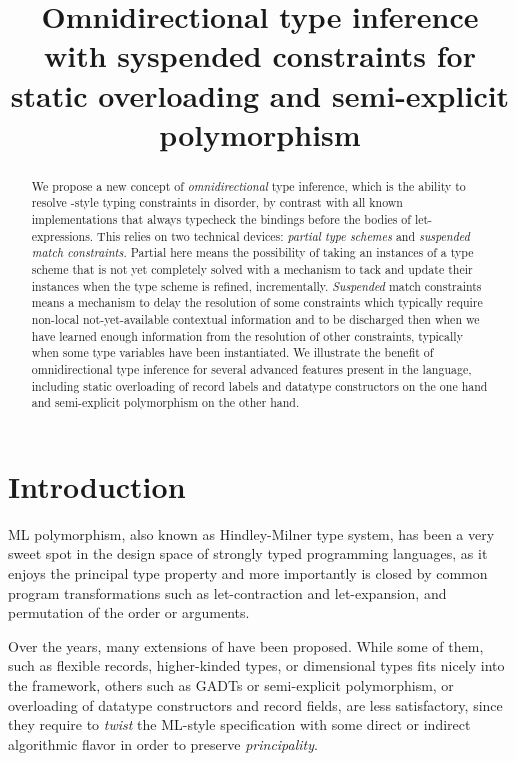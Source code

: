\documentclass[acmsmall,screen,nonacm]{acmart}
\title{Omnidirectional type inference with syspended constraints
   for static overloading and semi-explicit polymorphism}
\begin{document}
\begin{abstract}
We propose a new concept of \emph{omnidirectional} type inference, which is
the ability to resolve \ML-style typing constraints in disorder, by
contrast with all known implementations that always typecheck the
bindings before the bodies of let-expressions.
%
This relies on two technical devices: \emph{partial type schemes}
and \emph{suspended match constraints}. Partial here means  the
possibility of taking an instances of a type scheme that is not yet
completely solved with a mechanism to tack and update their instances when
the type scheme is refined, incrementally.
\emph{Suspended} match constraints means a mechanism to delay the resolution of
some constraints which typically require non-local not-yet-available
contextual information and to be discharged then when we have learned enough
information from the resolution of other constraints, typically when some type
variables have been instantiated.
%
We illustrate the benefit of omnidirectional type inference for several
advanced features present in the \OCaml language, including static
overloading of record labels and datatype constructors on the one hand and
semi-explicit polymorphism on the other hand.
\end{abstract}

\maketitle


\section{Introduction}

ML polymorphism, also known as Hindley-Milner type system, has been a very
sweet spot in the design space of strongly typed programming languages, as
it enjoys the principal type property and more importantly is closed by
common program transformations such as let-contraction and let-expansion,
and permutation of the order or arguments.

Over the years, many extensions of \ML have been proposed.  While some of
them, such as flexible records, higher-kinded types, or dimensional types
fits nicely into the \ML framework, others such as GADTs or semi-explicit
polymorphism, or overloading of datatype constructors and record fields, are
less satisfactory, since they require to \emph{twist} the ML-style
specification with some direct or indirect algorithmic flavor in order to
preserve \emph{principality}.
\end{document}

